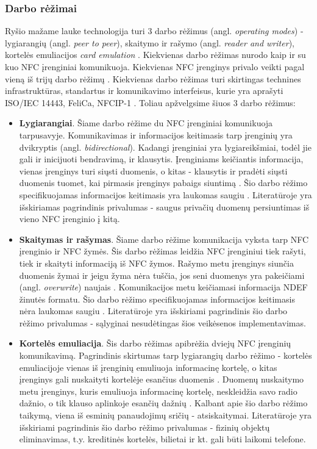 \subsubsection{Darbo rėžimai}
Ryšio mažame lauke technologija turi 3 darbo rėžimus (angl. \textit{operating modes}) - lygiarangių (angl. \textit{peer to peer}), skaitymo ir rašymo (angl. \textit{reader and writer}), kortelės emuliacijos \textit{card emulation} \cite{whitepaper2}. Kiekvienas darbo rėžimas nurodo kaip ir su kuo NFC įrenginiai komunikuoja. Kiekvienas NFC įrenginys privalo veikti pagal vieną iš trijų darbo rėžimų \cite{Motlagh2012}. Kiekvienas darbo rėžimas turi skirtingas technines infrastruktūras, standartus ir komunikavimo interfeisus, kurie yra aprašyti ISO/IEC 14443, FeliCa, NFCIP-1 \cite{Leora1980}.
Toliau apžvelgsime šiuos 3 darbo rėžimus:
\begin{itemize}
    \item \textbf{Lygiarangiai}. Šiame darbo rėžime du NFC įrenginiai komunikuoja tarpusavyje. Komunikavimas ir informacijos keitimasis tarp įrenginių yra dvikryptis (angl. \textit{bidirectional}). Kadangi įrenginiai yra lygiareikšmiai, todėl jie gali ir inicijuoti bendravimą, ir klausytis. Įrenginiams keičiantis informacija, vienas įrenginys turi siųsti duomenis, o kitas - klausytis ir pradėti siųsti duomenis tuomet, kai pirmasis įrenginys pabaigs siuntimą \cite{Leora1980}. Šio darbo rėžimo specifikuojamas informacijos keitimasis yra laukomas saugiu \cite{Rahul2015}. Literatūroje \cite{Leora1980} yra išskiriamas pagrindinis privalumas - saugus privačių duomenų persiuntimas iš vieno NFC įrenginio į kitą.
    \item \textbf{Skaitymas ir rašymas}. Šiame darbo rėžime komunikacija vyksta tarp NFC įrenginio ir NFC žymės. Šis darbo rėžimas leidžia NFC įrenginiui tiek rašyti, tiek ir skaityti informaciją iš NFC žymos. Rašymo metu įrenginys siunčia duomenis žymai ir jeigu žyma nėra tuščia, jos seni duomenys yra pakeičiami (angl. \textit{overwrite}) naujais \cite{Leora1980}. Komunikacijos metu keičiamasi informacija NDEF žinutės formatu.  Šio darbo rėžimo specifikuojamas informacijos keitimasis nėra laukomas saugiu \cite{Rahul2015}. Literatūroje \cite{Leora1980} yra išskiriami pagrindinis šio darbo rėžimo privalumas - sąlyginai nesudėtingas šios veikėsenos implementavimas.
    \item \textbf{Kortelės emuliacija}. Šis darbo rėžimas apibrėžia dviejų NFC įrenginių komunikavimą. Pagrindinis skirtumas tarp lygiarangių darbo rėžimo - kortelės emuliacijoje vienas iš įrenginių emuliuoja informacinę kortelę, o kitas įrenginys gali nuskaityti kortelėje esančius duomenis \cite{Motlagh2012}. Duomenų nuskaitymo metu įrenginys, kuris emuliuoja informacinę kortelę, neskleidžia savo radio dažnio, o tik klauso aplinkoje esančių dažnių \cite{Leora1980}. Kalbant apie šio darbo rėžimo taikymą, viena iš esminių panaudojimų sričių - atsiskaitymai. Literatūroje \cite{Leora1980} yra išskiriami pagrindinis šio darbo rėžimo privalumas - fizinių objektų eliminavimas, t.y. kreditinės kortelės, bilietai ir kt. gali būti laikomi telefone.
\end{itemize}

